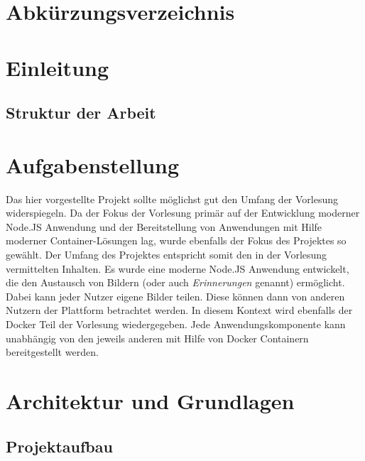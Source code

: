 \documentclass[12pt,a4paper]{report}
\begin{document}
\newpage
\chapter*{Abkürzungsverzeichnis}
\begin{acronym}[slmtA]
\end{acronym}  


\newpage
\tableofcontents

\newpage
\listoffigures

\newpage
\listoftables

\newpage
\chapter{Einleitung}

\section*{Struktur der Arbeit}

\newpage
\chapter{Aufgabenstellung}

Das hier vorgestellte Projekt sollte möglichst gut den Umfang der Vorlesung widerspiegeln. Da der Fokus der Vorlesung primär auf der Entwicklung moderner Node.JS Anwendung und der Bereitstellung von Anwendungen mit Hilfe moderner Container-Lösungen lag, wurde ebenfalls der Fokus des Projektes so gewählt. Der Umfang des Projektes entspricht somit den in der Vorlesung vermittelten Inhalten. Es wurde eine moderne Node.JS Anwendung entwickelt, die den Austausch von Bildern (oder auch \textit{Erinnerungen} genannt) ermöglicht. Dabei kann jeder Nutzer eigene Bilder teilen. Diese können dann von anderen Nutzern der Plattform betrachtet werden. In diesem Kontext wird ebenfalls der Docker Teil der Vorlesung wiedergegeben. Jede Anwendungskomponente kann unabhängig von den jeweils anderen mit Hilfe von Docker Containern bereitgestellt werden.

\newpage
\chapter{Architektur und Grundlagen}

\section{Projektaufbau}
\end{document}
